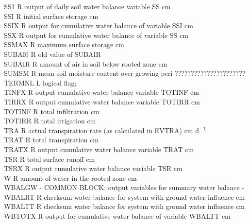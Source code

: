 \documentclass[11pt]{article}
\begin{document}
\begin{tabbing}
SS1\> \> R\> output of daily soil water balance variable SS\> \> \> \> \> \> \> cm\\
SSI\> \> R\> initial surface storage\> \> \> \> \> \> \> cm\\
SSIX\> \> R\> output for cumulative water balance of variable SSI\> \> \> \> \> \> \> cm\\
SSX\> \> R\> output for cumulative water balance of variable SS\> \> \> \> \> \> \> cm\\
SSMAX\> \> R\> maximum surface storage\> \> \> \> \> \> \> cm\\
SUBAI0\> \> R\> old value of SUBAIR\\
SUBAIR\> \> R\> amount of air in soil below rooted zone\> \> \> \> \> \> \> cm\\
SUMSM\> \> R\> mean soil moisture content over growing peri  ??????????????????????\\
TERMNL\> \> L\> logical flag;\\
TINFX\> \> R\> output cumulative water balance variable TOTINF\> \> \> \> \> \> \> cm\\
TIRRX\> \> R\> output cumulative water balance variable TOTIRR\> \> \> \> \> \> \> cm\\
TOTINF\> \> R\> total infiltration\> \> \> \> \> \> \> cm\\
TOTIRR\> \> R\> total irrigation\> \> \> \> \> \> \> cm\\
TRA\> \> R\> actual transpiration rate (as calculated in EVTRA)\> \> \> \> \> \> \> cm d$^{{\rm -1}}$\\
TRAT\> \> R\> total transpiration\> \> \> \> \> \> \> cm\\
TRATX\> \> R\> output cumulative water balance variable TRAT\> \> \> \> \> \> \> cm\\
TSR\> \> R\> total surface runoff\> \> \> \> \> \> \> cm\\
TSRX\> \> R\> output cumulative water balance variable TSR\> \> \> \> \> \> \> cm\\
W\> \> R\> amount of water in the rooted zone\> \> \> \> \> \> \> cm\\
WBALGW\> \> -\> COMMON BLOCK; output variables for summary water balance\> \> \> \> \> \> \> -\\
WBALRT\> \> R\> checksum water balance for system with ground water influence\> \> \> \> \> \> \> cm\\
WBALTT\> \> R\> checksum water balance for system with ground water influence\> \> \> \> \> \> \> cm\\
WBTOTX\> \> R\> output for cumulative water balance of variable WBALTT\> \> \> \> \> \> \> cm\\

\end{tabbing}
\end{document}
